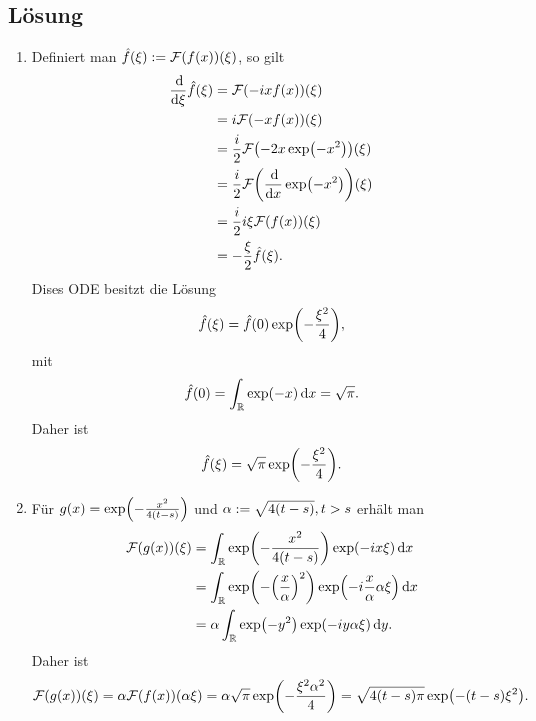 \documentclass{exercise}
\begin{document}
    \subsection*{Lösung}
    \begin{enumerate}
        \item Definiert man \(\hat{f}\parentheses*{\xi} := \mathcal{F}\parentheses*{f\parentheses*{x}}\parentheses*{\xi}\), so gilt
        \begin{align*}
            \frac{\d}{\d\xi}\hat{f}\parentheses*{\xi} &= \mathcal{F}\parentheses*{-ixf\parentheses*{x}}\parentheses*{\xi}\\
            &= i\mathcal{F}\parentheses*{-xf\parentheses*{x}}\parentheses*{\xi}\\
            &= \frac{i}{2}\mathcal{F}\parentheses*{-2x\exp\parentheses*{-x^2}}\parentheses*{\xi}\\
            &= \frac{i}{2}\mathcal{F}\parentheses*{\frac{\d}{\d x}\exp\parentheses*{-x^2}}\parentheses*{\xi}\\
            &= \frac{i}{2}i\xi\mathcal{F}\parentheses*{f\parentheses*{x}}\parentheses*{\xi}\\
            &= -\frac{\xi}{2}\hat{f}\parentheses*{\xi}.
        \end{align*}
        Dises ODE besitzt die Lösung
        \[
            \hat{f}\parentheses*{\xi} = \hat{f}\parentheses*{0}\exp\parentheses*{-\frac{\xi^2}{4}},
        \]
        mit
        \[
            \hat{f}\parentheses*{0} = \int_\R \exp\parentheses*{-x}\d x = \sqrt{\pi}.
        \]
        Daher ist
        \[
            \hat{f}\parentheses*{\xi} = \sqrt{\pi}\exp\parentheses*{-\frac{\xi^2}{4}}.
        \]
        \item Für \(g\parentheses*{x} = \exp\parentheses*{-\frac{x^2}{4\parentheses*{t - s}}}\) und \(\alpha := \sqrt{4\parentheses*{t - s}}, t > s\) erhält man
        \begin{align*}
            \mathcal{F}\parentheses*{g\parentheses*{x}}\parentheses*{\xi} &= \int_\R \exp\parentheses*{-\frac{x^2}{4\parentheses*{t - s}}}\exp\parentheses*{-ix\xi}\d x\\
            &= \int_\R \exp\parentheses*{-\parentheses*{\frac{x}{\alpha}}^2}\exp\parentheses*{-i\frac{x}{\alpha}\alpha\xi}\d x\\
            &= \alpha\int_\R \exp\parentheses*{-y^2}\exp\parentheses*{-iy\alpha\xi}\d y.
        \end{align*}
        Daher ist
        \[
            \mathcal{F}\parentheses*{g\parentheses*{x}}\parentheses*{\xi} = \alpha\mathcal{F}\parentheses*{f\parentheses*{x}}\parentheses*{\alpha\xi} = \alpha\sqrt{\pi}\exp\parentheses*{-\frac{\xi^2 \alpha^2}{4}} = \sqrt{4\parentheses*{t - s}\pi}\exp\parentheses*{-\parentheses*{t - s}\xi^2}.
\]
\end{enumerate}
\end{document}
